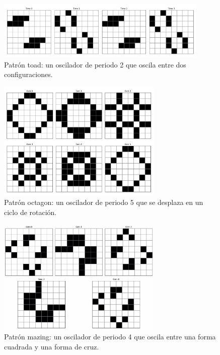 \documentclass[]{article}
\begin{document}
\begin{figure}[H]
  \centering
  \includegraphics[width=0.9\textwidth]{../assets/oscillator/toad/toad.png}
  \caption{Patrón toad: un oscilador de periodo 2 que oscila entre dos configuraciones.}
  \label{fig:toad}
\end{figure}

\begin{figure}[H]
  \centering
  \includegraphics[width=0.7\textwidth]{../assets/oscillator/octagon_2/octagon_2.png}
  \caption{Patrón octagon: un oscilador de periodo 5 que se desplaza en un ciclo de rotación.}
  \label{fig:octagon}
\end{figure}

\begin{figure}[H]
  \centering
  \includegraphics[width=0.7\textwidth]{../assets/oscillator/mazing/mazing.jpg}
  \caption{Patrón mazing: un oscilador de periodo 4 que oscila entre una forma cuadrada y una forma de cruz.}
  \label{fig:mazing}
\end{figure}
\end{document}
